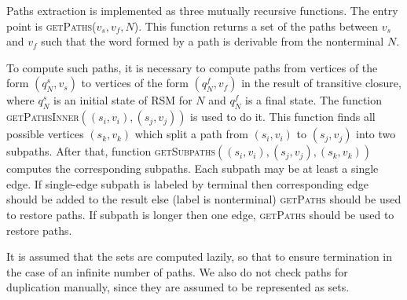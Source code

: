Paths extraction is implemented as three mutually recursive functions.
The entry point is \textsc{getPaths}($v_s, v_f, N$).
This function returns a set of the paths between $v_s$ and $v_f$ such that the word formed by a path is derivable from the nonterminal $N$.

To compute such paths, it is necessary to compute paths from vertices of the form $(q_N^s,v_s)$ to vertices of the form $(q_N^f, v_f)$ in the result of transitive closure, where $q_N^s$ is an initial state of RSM for $N$ and $q_N^f$ is a final state.
The function \textsc{getPathsInner}$((s_i,v_i),(s_j,v_j))$ is used to do it.
This function finds all possible vertices $(s_k,v_k)$  which split a path from $(s_i,v_i)$ to $(s_j,v_j)$ into two subpaths.
After that, function \textsc{getSubpaths}$((s_i,v_i),(s_j,v_j),(s_k,v_k))$ computes the corresponding subpaths.
Each subpath may be at least a single edge.
If single-edge subpath is labeled by terminal then corresponding edge should be added to the result else (label is nonterminal) \textsc{getPaths} should be used to restore paths.
If subpath is longer then one edge, \textsc{getPaths} should be used to restore paths. 

It is assumed that the sets are computed lazily, so that to ensure termination in the case of an infinite number of paths.
We also do not check paths for duplication manually, since they are assumed to be represented as sets.